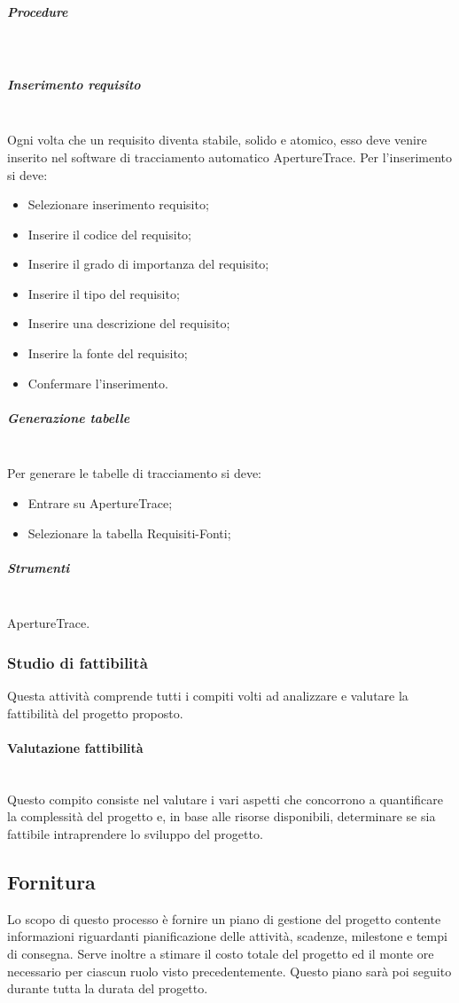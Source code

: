 \subparagraph{Procedure} \hfill \\
\subparagraph{Inserimento requisito} \hfill \\
Ogni volta che un requisito diventa stabile, solido e atomico, esso deve venire inserito nel software di tracciamento automatico ApertureTrace. 
Per l'inserimento si deve:
\begin{itemize}
\item Selezionare inserimento requisito;
\item Inserire il codice del requisito;
\item Inserire il grado di importanza del requisito;
\item Inserire il tipo del requisito;
\item Inserire una descrizione del requisito;
\item Inserire la fonte del requisito;
\item Confermare l'inserimento.
\end{itemize}

\subparagraph{Generazione tabelle} \hfill \\
Per generare le tabelle di tracciamento si deve:

\begin{itemize}
\item Entrare su ApertureTrace;
\item Selezionare la tabella Requisiti-Fonti;

\end{itemize}


\subparagraph{Strumenti} \hfill \\
ApertureTrace.

\subsubsection{Studio di fattibilità}
Questa attività comprende tutti i compiti volti ad analizzare e valutare la fattibilità del progetto proposto.

\paragraph{Valutazione fattibilità} \hfill \\
Questo compito consiste nel valutare i vari aspetti che concorrono a quantificare la complessità del progetto e, in base alle risorse disponibili, determinare se sia fattibile intraprendere lo sviluppo del progetto. 


\subsection{Fornitura}
Lo scopo di questo processo è fornire un piano di gestione del progetto contente informazioni riguardanti pianificazione delle attivit\`{a}, scadenze, milestone e tempi di consegna.
Serve inoltre a stimare il costo totale del progetto ed il monte ore necessario per ciascun ruolo visto precedentemente.
Questo piano sarà poi seguito durante tutta la durata del progetto.

